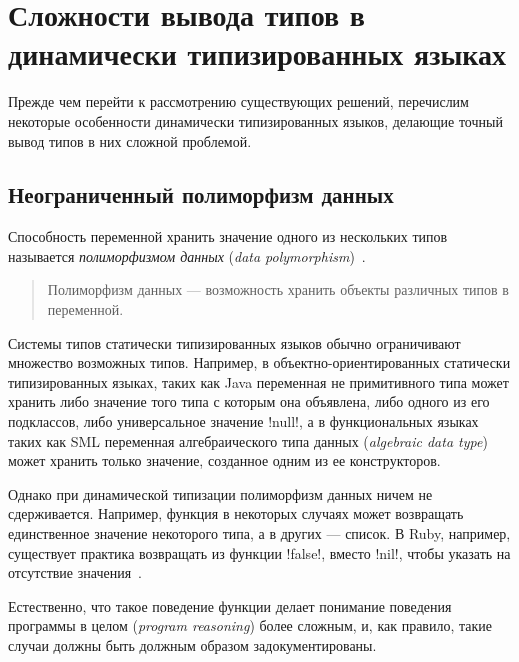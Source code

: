 
\section{Сложности вывода типов в динамически типизированных языках}
\label{sec:difficulties}

Прежде чем перейти к рассмотрению существующих решений, перечислим некоторые
особенности динамически типизированных языков, делающие точный вывод типов в них
сложной проблемой.

\subsection{Неограниченный полиморфизм данных}

Способность переменной хранить значение одного из нескольких типов называется
\emph{полиморфизмом данных} (\emph{data polymorphism})~\cite{Agesen1995}. 

\begin{quote}

  Полиморфизм данных --- возможность хранить объекты различных типов в
  переменной.
\end{quote}

Системы типов статически типизированных языков обычно ограничивают множество
возможных типов.  Например, в объектно-ориентированных статически типизированных
языках, таких как Java переменная не примитивного типа может хранить либо
значение того типа с которым она объявлена, либо одного из его подклассов, либо
универсальное значение !null!, а в функциональных языках таких как SML
переменная алгебраического типа данных (\emph{algebraic data type}) может
хранить только значение, созданное одним из ее конструкторов.

Однако при динамической типизации полиморфизм данных ничем не
сдерживается. Например, функция в некоторых случаях может возвращать
единственное значение некоторого типа, а в других --- список. В Ruby,
например, существует практика возвращать из функции !false!, вместо !nil!, чтобы
указать на отсутствие значения~\cite{Ren2013}. 

Естественно, что такое поведение функции делает понимание поведения программы в
целом (\emph{program reasoning}) более сложным, и, как правило, такие случаи
должны быть должным образом задокументированы. 

